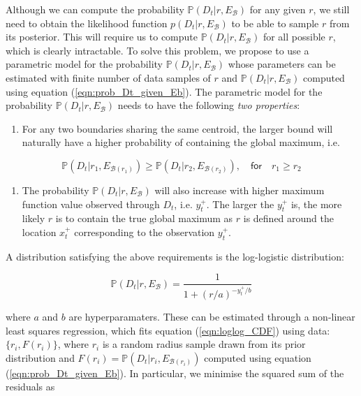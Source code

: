 \documentclass[preprint]{elsarticle}
\begin{document}
Although we can compute the probability $\mathbb{P}(D_t|r,E_{\mathcal{B}})$ for any given $r$, we still need to obtain the likelihood function $p(D_t|r,E_{\mathcal{B}})$ to be able to sample $r$ from its posterior. This will require us to compute $\mathbb{P}(D_t|r,E_{\mathcal{B}})$ for all possible $r$, which is clearly intractable. To solve this problem, we propose to use a parametric model for the probability $\mathbb{P}(D_t|r,E_{\mathcal{B}})$ whose parameters can be estimated with finite number of data samples of $r$ and $\mathbb{P}(D_t|r,E_{\mathcal{B}})$ computed using equation (\ref{eqn:prob_Dt_given_Eb}). The parametric model for the probability $\mathbb{P}(D_t|r,E_{\mathcal{B}})$ needs to have the following \emph{two properties}:
\begin{enumerate}
\item For any two boundaries sharing the same centroid, the larger bound will naturally have a higher probability of containing the global maximum, i.e.
\end{enumerate}
\begin{equation}
\mathbb{P}(D_t|r_1,E_{\mathcal{B}(r_1)}) \geq \mathbb{P}(D_t|r_2,E_{\mathcal{B}(r_2)}),\quad \mathsf{for} \quad r_1\geq r_2
\end{equation}
\begin{enumerate}
\setcounter{enumi}1
\item The probability $\mathbb{P}(D_t|r,E_{\mathcal{B}})$ will also increase with higher maximum function value observed through $D_t$, i.e. $y_t^+$. The larger the $y_t^+$ is, the more likely $r$ is to contain the true global maximum as $r$ is defined around the location $x_t^+$ corresponding to the observation $y_t^+$.  
\end{enumerate}
A distribution satisfying the above requirements is the log-logistic distribution:
\begin{linenomath*}
\begin{equation}
\mathbb{P}(D_t|r,E_{\mathcal{B}})=\frac{1}{1+(r/a)^{-y_t^+/b}}\label{eqn:loglog_CDF}
\end{equation}
\end{linenomath*}
where $a$ and $b$ are hyperparamaters. These can be estimated through a non-linear least squares regression, which fits equation (\ref{eqn:loglog_CDF}) using data: $\{r_i,F(r_i)\}$, where $r_i$ is a random radius sample drawn from its prior distribution and $F(r_i) = \mathbb{P}(D_t|r_i,E_{\mathcal{B}(r_i)})$ computed using equation (\ref{eqn:prob_Dt_given_Eb}). In particular, we  minimise the squared sum of the residuals as
\end{document}
